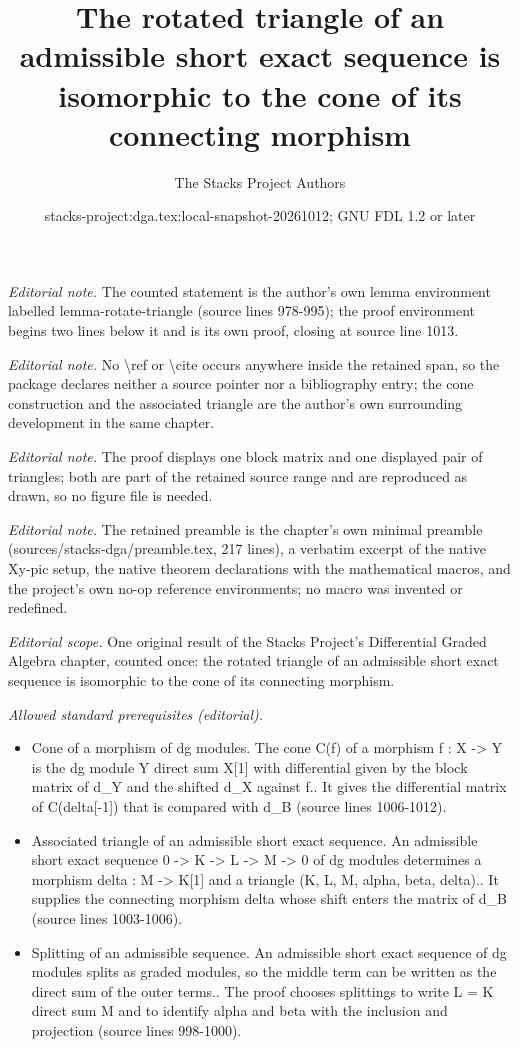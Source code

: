 \documentclass{stacks-project}
\title{The rotated triangle of an admissible short exact sequence is isomorphic to the cone of its connecting morphism}
\author{The Stacks Project Authors}
\date{stacks-project:dga.tex:local-snapshot-20261012; GNU FDL 1.2 or later}
\theoremstyle{plain}
\theoremstyle{definition}
\theoremstyle{remark}
\numberwithin{equation}{subsection}
\begin{document}
\maketitle
\noindent\textit{Editorial note.} The counted statement is the author's own lemma environment labelled lemma-rotate-triangle (source lines 978-995); the proof environment begins two lines below it and is its own proof, closing at source line 1013.\par\medskip
\noindent\textit{Editorial note.} No \textbackslash{}ref or \textbackslash{}cite occurs anywhere inside the retained span, so the package declares neither a source pointer nor a bibliography entry; the cone construction and the associated triangle are the author's own surrounding development in the same chapter.\par\medskip
\noindent\textit{Editorial note.} The proof displays one block matrix and one displayed pair of triangles; both are part of the retained source range and are reproduced as drawn, so no figure file is needed.\par\medskip
\noindent\textit{Editorial note.} The retained preamble is the chapter's own minimal preamble (sources/stacks-dga/preamble.tex, 217 lines), a verbatim excerpt of the native Xy-pic setup, the native theorem declarations with the mathematical macros, and the project's own no-op reference environments; no macro was invented or redefined.\par\medskip
\noindent\textit{Editorial scope.} One original result of the Stacks Project's Differential Graded Algebra chapter, counted once: the rotated triangle of an admissible short exact sequence is isomorphic to the cone of its connecting morphism.\par\medskip
\noindent\textit{Allowed standard prerequisites (editorial).}\begin{itemize}
\item Cone of a morphism of dg modules. The cone C(f) of a morphism f : X -> Y is the dg module Y direct sum X[1] with differential given by the block matrix of d\_Y and the shifted d\_X against f.. It gives the differential matrix of C(delta[-1]) that is compared with d\_B (source lines 1006-1012).
\item Associated triangle of an admissible short exact sequence. An admissible short exact sequence 0 -> K -> L -> M -> 0 of dg modules determines a morphism delta : M -> K[1] and a triangle (K, L, M, alpha, beta, delta).. It supplies the connecting morphism delta whose shift enters the matrix of d\_B (source lines 1003-1006).
\item Splitting of an admissible sequence. An admissible short exact sequence of dg modules splits as graded modules, so the middle term can be written as the direct sum of the outer terms.. The proof chooses splittings to write L = K direct sum M and to identify alpha and beta with the inclusion and projection (source lines 998-1000).
\end{itemize}\medskip
\end{document}

